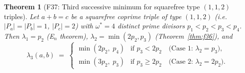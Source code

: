 \documentclass[12pt]{article}
\newtheorem{theorem}{Theorem}
\theoremstyle{definition}
\begin{document}
\begin{theorem}[F37: Third successive minimum for squarefree type $(1,1,2)$ triples]\label{thm:f37}
  Let $a + b = c$ be a squarefree coprime triple of type $(1,1,2)$
  (i.e.\ $|P_a|=|P_b|=1$, $|P_c|=2$) with $\omega^*=4$ distinct prime divisors
  $p_1 < p_2 < p_3 < p_4$.  Then $\lambda_1 = p_2$ (E$_n$ theorem), $\lambda_2 = \min(2p_2,p_3)$
  (Theorem~\ref{thm:f36}), and
  \[
    \lambda_3(a,b) \;=\;
    \begin{cases}
      \min(2p_2,\; p_4) & \text{if } p_3 < 2p_2 \quad \text{(Case~1: $\lambda_2 = p_3$)}, \\[4pt]
      \min(3p_2,\; p_3) & \text{if } p_3 \ge 2p_2 \quad \text{(Case~2: $\lambda_2 = 2p_2$)}.
    \end{cases}
  \]
\end{theorem}
\end{document}
